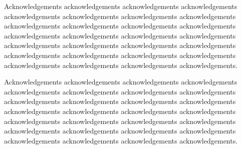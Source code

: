 
% 
% 
% 
% 
% 
% 
% 
% 
% 


Acknowledgements acknowledgements acknowledgements acknowledgements
acknowledgements acknowledgements acknowledgements acknowledgements
acknowledgements acknowledgements acknowledgements acknowledgements
acknowledgements acknowledgements acknowledgements acknowledgements
acknowledgements acknowledgements acknowledgements acknowledgements
acknowledgements acknowledgements acknowledgements acknowledgements
acknowledgements acknowledgements acknowledgements acknowledgements.

Acknowledgements acknowledgements acknowledgements acknowledgements
acknowledgements acknowledgements acknowledgements acknowledgements
acknowledgements acknowledgements acknowledgements acknowledgements
acknowledgements acknowledgements acknowledgements acknowledgements
acknowledgements acknowledgements acknowledgements acknowledgements
acknowledgements acknowledgements acknowledgements acknowledgements
acknowledgements acknowledgements acknowledgements acknowledgements.

